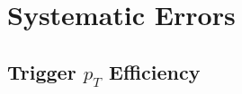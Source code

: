  

\chapter[Systematic Errors]{Systematic Errors}

\section{Trigger $p_T$ Efficiency}
\label{sec:trigger_syst}



